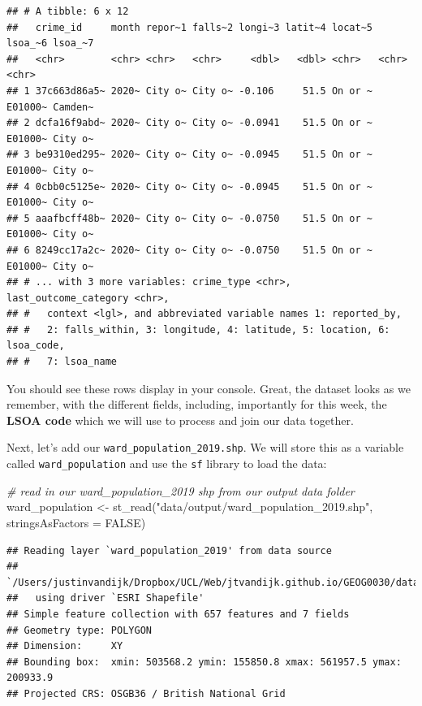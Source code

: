 \documentclass[
]{book}
\newenvironment{Shaded}{\begin{snugshade}}{\end{snugshade}}
\newcommand{\AttributeTok}[1]{\textcolor[rgb]{0.77,0.63,0.00}{#1}}
\newcommand{\CommentTok}[1]{\textcolor[rgb]{0.56,0.35,0.01}{\textit{#1}}}
\newcommand{\ConstantTok}[1]{\textcolor[rgb]{0.00,0.00,0.00}{#1}}
\newcommand{\FunctionTok}[1]{\textcolor[rgb]{0.00,0.00,0.00}{#1}}
\newcommand{\NormalTok}[1]{#1}
\newcommand{\OtherTok}[1]{\textcolor[rgb]{0.56,0.35,0.01}{#1}}
\newcommand{\StringTok}[1]{\textcolor[rgb]{0.31,0.60,0.02}{#1}}
\begin{document}
\begin{verbatim}
## # A tibble: 6 x 12
##   crime_id     month repor~1 falls~2 longi~3 latit~4 locat~5 lsoa_~6 lsoa_~7
##   <chr>        <chr> <chr>   <chr>     <dbl>   <dbl> <chr>   <chr>   <chr>  
## 1 37c663d86a5~ 2020~ City o~ City o~ -0.106     51.5 On or ~ E01000~ Camden~
## 2 dcfa16f9abd~ 2020~ City o~ City o~ -0.0941    51.5 On or ~ E01000~ City o~
## 3 be9310ed295~ 2020~ City o~ City o~ -0.0945    51.5 On or ~ E01000~ City o~
## 4 0cbb0c5125e~ 2020~ City o~ City o~ -0.0945    51.5 On or ~ E01000~ City o~
## 5 aaafbcff48b~ 2020~ City o~ City o~ -0.0750    51.5 On or ~ E01000~ City o~
## 6 8249cc17a2c~ 2020~ City o~ City o~ -0.0750    51.5 On or ~ E01000~ City o~
## # ... with 3 more variables: crime_type <chr>, last_outcome_category <chr>,
## #   context <lgl>, and abbreviated variable names 1: reported_by,
## #   2: falls_within, 3: longitude, 4: latitude, 5: location, 6: lsoa_code,
## #   7: lsoa_name
\end{verbatim}

You should see these rows display in your console. Great, the dataset looks as we remember, with the different fields, including, importantly for this week, the \textbf{LSOA code} which we will use to process and join our data together.

Next, let's add our \texttt{ward\_population\_2019.shp}. We will store this as a variable called \texttt{ward\_population} and use the \texttt{sf} library to load the data:

\begin{Shaded}
\begin{Highlighting}[]
\CommentTok{\# read in our ward\_population\_2019 shp from our output data folder}
\NormalTok{ward\_population }\OtherTok{\textless{}{-}} \FunctionTok{st\_read}\NormalTok{(}\StringTok{"data/output/ward\_population\_2019.shp"}\NormalTok{, }\AttributeTok{stringsAsFactors =} \ConstantTok{FALSE}\NormalTok{)}
\end{Highlighting}
\end{Shaded}

\begin{verbatim}
## Reading layer `ward_population_2019' from data source 
##   `/Users/justinvandijk/Dropbox/UCL/Web/jtvandijk.github.io/GEOG0030/data/output/ward_population_2019.shp' 
##   using driver `ESRI Shapefile'
## Simple feature collection with 657 features and 7 fields
## Geometry type: POLYGON
## Dimension:     XY
## Bounding box:  xmin: 503568.2 ymin: 155850.8 xmax: 561957.5 ymax: 200933.9
## Projected CRS: OSGB36 / British National Grid
\end{verbatim}
\end{document}
